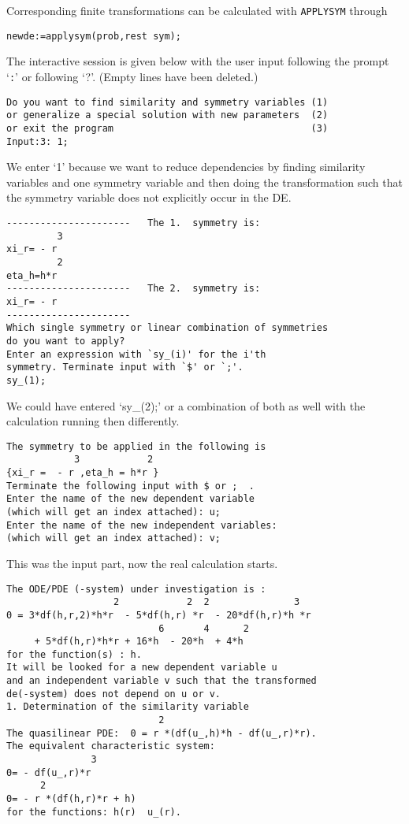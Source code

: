 Corresponding finite
transformations can be calculated with \texttt{APPLYSYM} through
{\small \begin{verbatim}
newde:=applysym(prob,rest sym);
\end{verbatim}}
The interactive session is given below with the user input following
the prompt `\texttt{:}' or following `?'. (Empty lines have been deleted.)
{\small \begin{verbatim}
Do you want to find similarity and symmetry variables (1)
or generalize a special solution with new parameters  (2)
or exit the program                                   (3)
Input:3: 1;
\end{verbatim}}
We enter `1' because we want to reduce dependencies by finding similarity
variables and one symmetry variable and then doing the transformation such
that the symmetry variable does not explicitly occur in the DE.
{\small \begin{verbatim}
----------------------   The 1.  symmetry is:
         3
xi_r= - r
         2
eta_h=h*r
----------------------   The 2.  symmetry is:
xi_r= - r
----------------------
Which single symmetry or linear combination of symmetries
do you want to apply?
Enter an expression with `sy_(i)' for the i'th
symmetry. Terminate input with `$' or `;'.
sy_(1);
\end{verbatim}}
We could have entered `sy\_(2);' or a combination of both
as well with the calculation running then
differently.
{\small \begin{verbatim}
The symmetry to be applied in the following is
            3            2
{xi_r =  - r ,eta_h = h*r }
Terminate the following input with $ or ;  .
Enter the name of the new dependent variable
(which will get an index attached): u;
Enter the name of the new independent variables:
(which will get an index attached): v;
\end{verbatim}}
This was the input part, now the real calculation starts.
{\small \begin{verbatim}
The ODE/PDE (-system) under investigation is :
                   2            2  2               3
0 = 3*df(h,r,2)*h*r  - 5*df(h,r) *r  - 20*df(h,r)*h *r
                           6       4      2
     + 5*df(h,r)*h*r + 16*h  - 20*h  + 4*h
for the function(s) : h.
It will be looked for a new dependent variable u
and an independent variable v such that the transformed
de(-system) does not depend on u or v.
1. Determination of the similarity variable
                           2
The quasilinear PDE:  0 = r *(df(u_,h)*h - df(u_,r)*r).
The equivalent characteristic system:
               3
0= - df(u_,r)*r
      2
0= - r *(df(h,r)*r + h)
for the functions: h(r)  u_(r).
\end{verbatim}}
